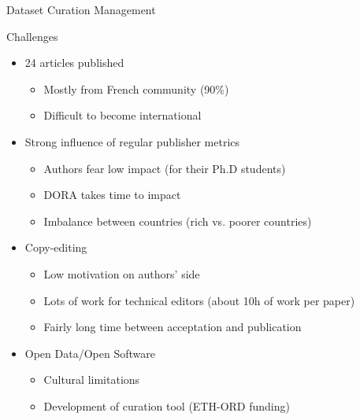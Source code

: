 \documentclass[10pt,compress,serif,aspectratio=169]{beamer}
\begin{document}


\begin{frame}[t]{Dataset Curation Management}
\end{frame}


\begin{frame}[t]{Challenges}
  \begin{itemize}
  \item 24 articles published
    \begin{itemize}
    \item Mostly from French community (90\%)
    \item Difficult to become international
    \end{itemize}
  \item Strong influence of regular publisher metrics
    \begin{itemize}
    \item Authors fear low impact (for their Ph.D students)
    \item DORA takes time to impact
    \item Imbalance between countries (rich vs. poorer countries)
    \end{itemize}
  \item Copy-editing
    \begin{itemize}
    \item Low motivation on authors' side
    \item Lots of work for technical editors (about 10h of work per paper)
    \item Fairly long time between acceptation and publication 
    \end{itemize}
  \item Open Data/Open Software 
    \begin{itemize}
    \item Cultural limitations
    \item Development of curation tool (ETH-ORD funding)
    \end{itemize}

  \end{itemize}
\end{frame}

\end{document}

